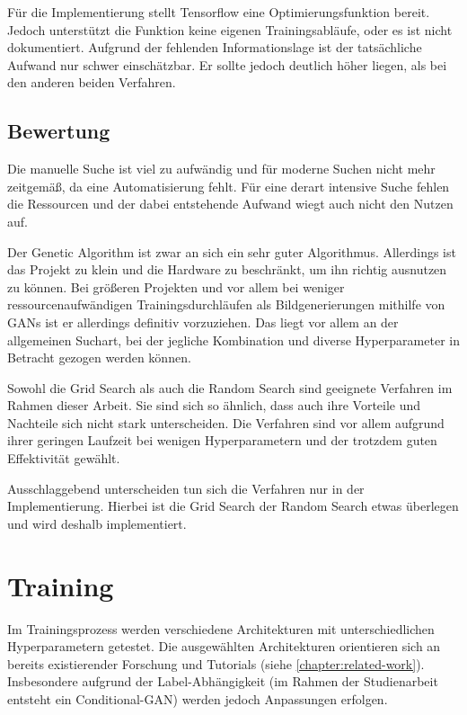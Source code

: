 Für die Implementierung stellt Tensorflow eine Optimierungsfunktion bereit.
Jedoch unterstützt die Funktion keine eigenen Trainingsabläufe, oder es ist nicht dokumentiert.
Aufgrund der fehlenden Informationslage ist der tatsächliche Aufwand nur schwer einschätzbar. 
Er sollte jedoch deutlich höher liegen, als bei den anderen beiden Verfahren.

\subsection{Bewertung}
Die manuelle Suche ist viel zu aufwändig und für moderne Suchen nicht mehr zeitgemäß, da eine Automatisierung fehlt.
Für eine derart intensive Suche fehlen die Ressourcen und der dabei entstehende Aufwand wiegt auch nicht den Nutzen auf.
\newline

Der Genetic Algorithm ist zwar an sich ein sehr guter Algorithmus.
Allerdings ist das Projekt zu klein und die Hardware zu beschränkt, um ihn richtig ausnutzen zu können.
Bei größeren Projekten und vor allem bei weniger ressourcenaufwändigen Trainingsdurchläufen als Bildgenerierungen mithilfe von GANs ist er allerdings definitiv vorzuziehen.
Das liegt vor allem an der allgemeinen Suchart, bei der jegliche Kombination und diverse Hyperparameter in Betracht gezogen werden können.
\newline

Sowohl die Grid Search als auch die Random Search sind geeignete Verfahren im Rahmen dieser Arbeit.
Sie sind sich so ähnlich, dass auch ihre Vorteile und Nachteile sich nicht stark unterscheiden.
Die Verfahren sind vor allem aufgrund ihrer geringen Laufzeit bei wenigen Hyperparametern und der trotzdem guten Effektivität gewählt.

Ausschlaggebend unterscheiden tun sich die Verfahren nur in der Implementierung.
Hierbei ist die Grid Search der Random Search etwas überlegen und wird deshalb implementiert.

\section{Training}
Im Trainingsprozess werden verschiedene Architekturen mit unterschiedlichen Hyperparametern getestet.
Die ausgewählten Architekturen orientieren sich an bereits existierender Forschung und Tutorials (siehe \cref{chapter:related-work}).
Insbesondere aufgrund der Label-Abhängigkeit (im Rahmen der Studienarbeit entsteht ein Conditional-GAN) werden jedoch Anpassungen erfolgen.


